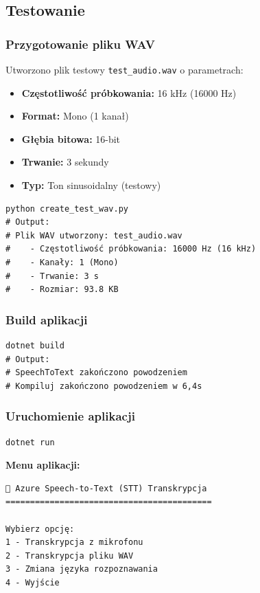 \subsection{Testowanie}

\subsubsection{Przygotowanie pliku WAV}

Utworzono plik testowy \texttt{test\_audio.wav} o parametrach:
\begin{itemize}
	\item \textbf{Częstotliwość próbkowania:} 16 kHz (16000 Hz)
	\item \textbf{Format:} Mono (1 kanał)
	\item \textbf{Głębia bitowa:} 16-bit
	\item \textbf{Trwanie:} 3 sekundy
	\item \textbf{Typ:} Ton sinusoidalny (testowy)
\end{itemize}

\begin{verbatim}
python create_test_wav.py
# Output:
# Plik WAV utworzony: test_audio.wav
#    - Częstotliwość próbkowania: 16000 Hz (16 kHz)
#    - Kanały: 1 (Mono)
#    - Trwanie: 3 s
#    - Rozmiar: 93.8 KB
\end{verbatim}

\subsubsection{Build aplikacji}

\begin{verbatim}
dotnet build
# Output:
# SpeechToText zakończono powodzeniem
# Kompiluj zakończono powodzeniem w 6,4s
\end{verbatim}

\subsubsection{Uruchomienie aplikacji}

\begin{verbatim}
dotnet run
\end{verbatim}

\textbf{Menu aplikacji:}
\begin{verbatim}
🎤 Azure Speech-to-Text (STT) Transkrypcja
==========================================

Wybierz opcję:
1 - Transkrypcja z mikrofonu
2 - Transkrypcja pliku WAV
3 - Zmiana języka rozpoznawania
4 - Wyjście
\end{verbatim}

